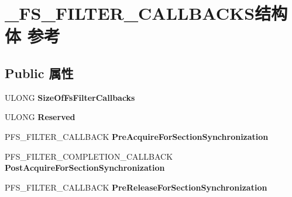 \hypertarget{struct___f_s___f_i_l_t_e_r___c_a_l_l_b_a_c_k_s}{}\section{\+\_\+\+F\+S\+\_\+\+F\+I\+L\+T\+E\+R\+\_\+\+C\+A\+L\+L\+B\+A\+C\+K\+S结构体 参考}
\label{struct___f_s___f_i_l_t_e_r___c_a_l_l_b_a_c_k_s}
\subsection*{Public 属性}
\begin{DoxyCompactItemize}
\item 
\mbox{\label{struct___f_s___f_i_l_t_e_r___c_a_l_l_b_a_c_k_s_a3bb0e322666a1f3846c02d84bc6f4b72}} 
U\+L\+O\+NG {\bfseries Size\+Of\+Fs\+Filter\+Callbacks}
\item 
\mbox{\label{struct___f_s___f_i_l_t_e_r___c_a_l_l_b_a_c_k_s_a223bd3821ed3ff00502b15b5c9774852}} 
U\+L\+O\+NG {\bfseries Reserved}
\item 
\mbox{\label{struct___f_s___f_i_l_t_e_r___c_a_l_l_b_a_c_k_s_a98555f6ba9707c4b96372ada76db8baf}} 
P\+F\+S\+\_\+\+F\+I\+L\+T\+E\+R\+\_\+\+C\+A\+L\+L\+B\+A\+CK {\bfseries Pre\+Acquire\+For\+Section\+Synchronization}
\item 
\mbox{\label{struct___f_s___f_i_l_t_e_r___c_a_l_l_b_a_c_k_s_a918d9bbc8b6a898378083e3535600355}} 
P\+F\+S\+\_\+\+F\+I\+L\+T\+E\+R\+\_\+\+C\+O\+M\+P\+L\+E\+T\+I\+O\+N\+\_\+\+C\+A\+L\+L\+B\+A\+CK {\bfseries Post\+Acquire\+For\+Section\+Synchronization}
\item 
\mbox{\label{struct___f_s___f_i_l_t_e_r___c_a_l_l_b_a_c_k_s_abce66d999eb41de6c6059d3378338266}} 
P\+F\+S\+\_\+\+F\+I\+L\+T\+E\+R\+\_\+\+C\+A\+L\+L\+B\+A\+CK {\bfseries Pre\+Release\+For\+Section\+Synchronization}
\item 
\mbox{\label{struct___f_s___f_i_l_t_e_r___c_a_l_l_b_a_c_k_s_aea0159cc87b76b398b4ea70e03ea5745}} 

\end{DoxyCompactItemize}
